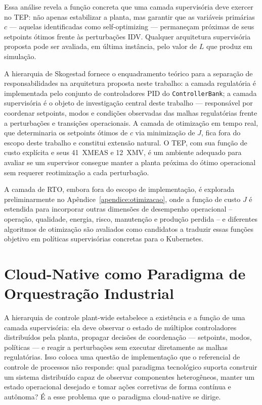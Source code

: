 Essa análise revela a função concreta que uma camada supervisória deve exercer no TEP: não apenas
estabilizar a planta, mas garantir que as variáveis primárias $c$ --- aquelas identificadas como
self-optimizing --- permaneçam próximas de seus setpoints ótimos frente às perturbações IDV.
Qualquer arquitetura supervisória proposta pode ser avaliada, em última instância, pelo valor de $L$
que produz em simulação.

A hierarquia de Skogestad fornece o enquadramento teórico para a separação de responsabilidades na
arquitetura proposta neste trabalho: a camada regulatória é implementada pelo conjunto de
controladores PID do \texttt{ControllerBank}; a camada supervisória é o objeto de investigação
central deste trabalho --- responsável por coordenar setpoints, modos e condições observadas das
malhas regulatórias frente a perturbações e transições operacionais. A camada de otimização em tempo
real, que determinaria os setpoints ótimos de $c$ via minimização de $J$, fica fora do escopo deste
trabalho e constitui extensão natural. O TEP, com sua função de custo explícita e seus 41~XMEAS e
12~XMV, é um ambiente adequado para avaliar se um supervisor consegue manter a planta próxima do
ótimo operacional sem requerer reotimização a cada perturbação.

A camada de RTO, embora fora do escopo de implementação, é explorada preliminarmente no
Apêndice~\ref{apendice:otimizacao}, onde a função de custo $J$ é estendida para incorporar outras
dimensões de desempenho operacional -- operação, qualidade, energia, risco, manutenção e produção
perdida -- e diferentes algoritmos de otimização são avaliados como candidatos a traduzir essas
funções objetivo em políticas supervisórias concretas para o Kubernetes.


\section{Cloud-Native como Paradigma de Orquestração Industrial}
\label{sec:cloudnative}

A hierarquia de controle plant-wide estabelece a existência e a função de uma camada supervisória: ela deve observar o estado de múltiplos controladores distribuídos pela planta, propagar decisões de coordenação --- setpoints, modos, políticas --- e reagir a perturbações sem executar diretamente as malhas regulatórias. Isso coloca uma questão de implementação que o referencial de controle de processos não responde: qual paradigma tecnológico suporta construir um sistema distribuído capaz de observar componentes heterogêneos, manter um estado operacional desejado e tomar ações corretivas de forma contínua e autônoma? É a esse problema que o paradigma cloud-native se dirige.


